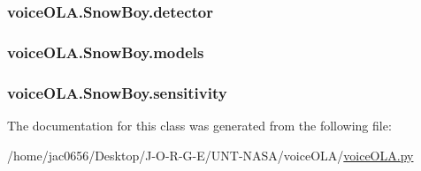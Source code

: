\subsubsection[{\texorpdfstring{detector}{detector}}]{\setlength{\rightskip}{0pt plus 5cm}voice\+O\+L\+A.\+Snow\+Boy.\+detector}\hypertarget{classvoiceOLA_1_1SnowBoy_a5be49a0ae11c7b41494cf42ecf26e88b}{}\label{classvoiceOLA_1_1SnowBoy_a5be49a0ae11c7b41494cf42ecf26e88b}
\subsubsection[{\texorpdfstring{models}{models}}]{\setlength{\rightskip}{0pt plus 5cm}voice\+O\+L\+A.\+Snow\+Boy.\+models}\hypertarget{classvoiceOLA_1_1SnowBoy_aaa4dad2978716142ba8097884afcc517}{}\label{classvoiceOLA_1_1SnowBoy_aaa4dad2978716142ba8097884afcc517}
\subsubsection[{\texorpdfstring{sensitivity}{sensitivity}}]{\setlength{\rightskip}{0pt plus 5cm}voice\+O\+L\+A.\+Snow\+Boy.\+sensitivity}\hypertarget{classvoiceOLA_1_1SnowBoy_af19c996792bb8af65dc007390d59c459}{}\label{classvoiceOLA_1_1SnowBoy_af19c996792bb8af65dc007390d59c459}


The documentation for this class was generated from the following file\+:\begin{DoxyCompactItemize}
\item 
/home/jac0656/\+Desktop/\+J-\/\+O-\/\+R-\/\+G-\/\+E/\+U\+N\+T-\/\+N\+A\+S\+A/voice\+O\+L\+A/\hyperlink{voiceOLA_8py}{voice\+O\+L\+A.\+py}\end{DoxyCompactItemize}
